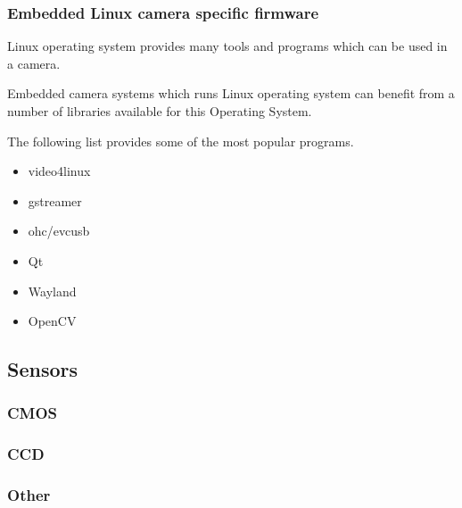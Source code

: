        \subsubsection{Embedded Linux camera specific firmware}
         Linux operating system provides many tools and programs which can be used in a camera.
        
         Embedded camera systems which runs Linux operating system can benefit from a number of libraries available for
         this Operating System. 

         The following list provides some of the most popular programs. 
       
         \begin{itemize}
           \item video4linux
           \item gstreamer 
           \item ohc/evcusb 
           \item Qt
           \item Wayland 
           \item OpenCV 
          \end{itemize}



    \subsection{Sensors}
       \subsubsection{CMOS}
       \subsubsection{CCD}
       \subsubsection{Other}
     
